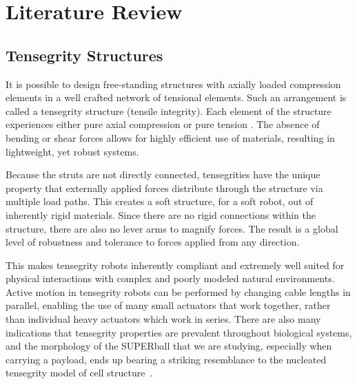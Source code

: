 \chapter{Literature Review}

\section{Tensegrity Structures}
It is possible to design free-standing structures with axially loaded compression elements in a well crafted network of tensional elements.
Such an arrangement is called a tensegrity structure (tensile integrity). 
Each element of the structure experiences either pure axial compression or pure tension \cite{BuckminsterFuller1975}\cite{Snelson1965}.
The absence of bending or shear forces allows for highly efficient use of materials, 
resulting in lightweight, yet robust systems.

Because the struts are not directly connected, 
tensegrities have the unique property that externally applied forces distribute through the structure via multiple load paths. 
This creates a soft structure, for a soft robot, out of inherently rigid materials.
Since there are no rigid connections within the structure, there are also no lever arms to magnify forces. 
The result is a global level of robustness and tolerance to forces applied from any direction.

This makes tensegrity robots inherently compliant and extremely well suited for physical interactions with complex and poorly modeled natural environments.  
Active motion in tensegrity robots can be performed by changing cable lengths in parallel, 
enabling the use of many small actuators that work together, rather than individual heavy actuators which work in series.  
There are also many indications that tensegrity properties are prevalent throughout biological systems, 
and the morphology of the SUPERball that we are studying, 
especially when carrying a payload, 
ends up bearing a striking resemblance to the nucleated tensegrity model of cell structure~\cite{Wang2009}\cite{Wang2001}.

